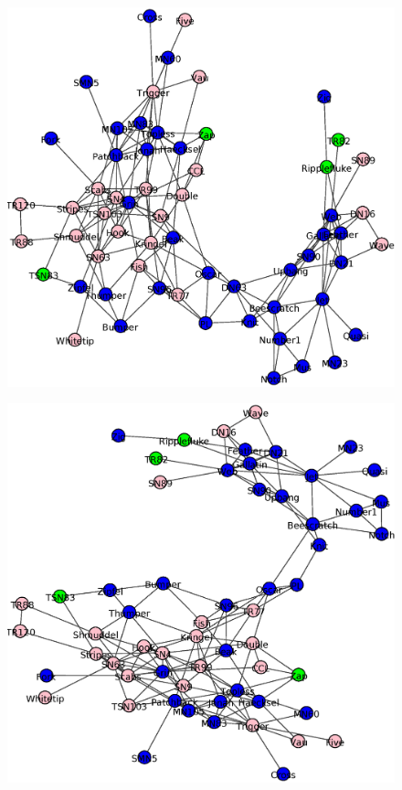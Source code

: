 \begin{figure}
\centering
\begin{subfloat}[]
{
	\includegraphics[scale = 0.27]{figuras/Parte_c0} 
}
\end{subfloat}
\begin{subfloat}[]
{
	\includegraphics[scale = 0.27]{figuras/Parte_c1}
}
\end{subfloat}
\end{figure}
